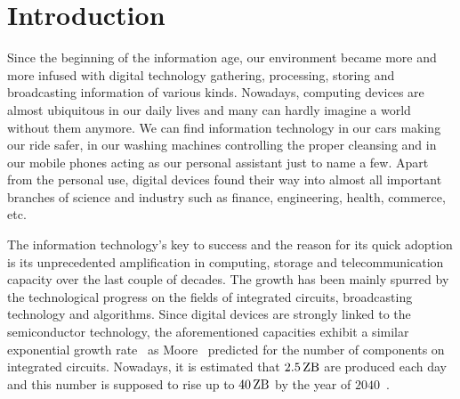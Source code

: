 \documentclass{dima}
\begin{document}
\date{\today}


\maketitle



\section{Introduction}
Since the beginning of the information age, our environment became more and more infused with digital technology gathering, processing, storing and broadcasting information of various kinds.
Nowadays, computing devices are almost ubiquitous in our daily lives and many can hardly imagine a world without them anymore.
We can find information technology in our cars making our ride safer, in our washing machines controlling the proper cleansing and in our mobile phones acting as our personal assistant just to name a few.
Apart from the personal use, digital devices found their way into almost all important branches of science and industry such as finance, engineering, health, commerce, etc.

The information technology's key to success and the reason for its quick adoption is its unprecedented amplification in computing, storage and telecommunication capacity over the last couple of decades.
The growth has been mainly spurred by the technological progress on the fields of integrated circuits, broadcasting technology and algorithms.
Since digital devices are strongly linked to the semiconductor technology, the aforementioned capacities exhibit a similar exponential growth rate~\cite{hilbert:s2011a} as Moore~\cite{moore:1965a} predicted for the number of components on integrated circuits.
Nowadays, it is estimated that $\SI{2.5}{\zetta\byte}$ are produced each day and this number is supposed to rise up to $\SI{40}{\zetta\byte}$ by the year of $\num{2040}$~\cite{ibm:2014a}.
\end{document}
